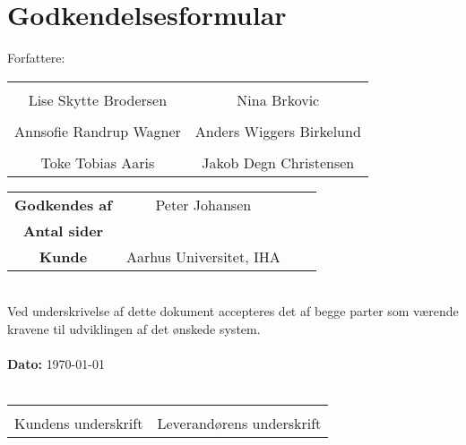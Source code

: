 \chapter{Godkendelsesformular}

{\large Forfattere:}
\\[5ex]


\begin{tabular}{c c}
\centering 
	\makebox[2.0in]{\hrulefill} & \makebox[2.0in]{\hrulefill}\\
	Lise Skytte Brodersen & Nina Brkovic\\[7ex]
	\makebox[2.0in]{\hrulefill} & \makebox[2.0in]{\hrulefill}\\
	Annsofie Randrup Wagner & Anders Wiggers Birkelund \\[7ex]
	\makebox[2.0in]{\hrulefill} & \makebox[2.0in]{\hrulefill}\\
	Toke Tobias Aaris & Jakob Degn Christensen\\[7ex]

\end{tabular}

\begin{tabular}{c c c c}
	\textbf{Godkendes af} & Peter Johansen\\[3ex]
	\textbf{Antal sider} & \pageref{LastPage} \\[3ex]
	\textbf{Kunde} & Aarhus Universitet, IHA
\end{tabular}\\[8ex]
Ved underskrivelse af dette dokument accepteres det af begge parter som værende kravene til udviklingen af det ønskede system.
\\
\\
\textbf{Dato:} {\today}
\\\\

\begin{tabular}{c c}
	\makebox[2.0in]{\hrulefill} & \makebox[2.0in]{\hrulefill}\\
	\centering 
	Kundens underskrift & Leverandørens underskrift
\end{tabular}
